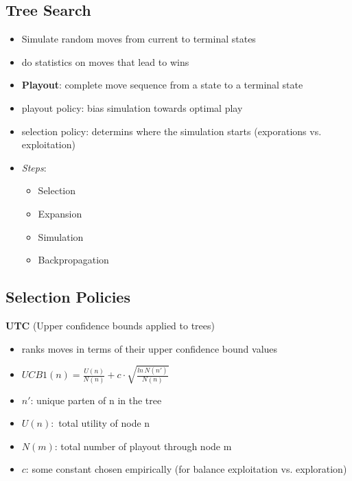 \documentclass[12pt,a4paper]{article}
\begin{document}
\subsection{Tree Search}
\begin{itemize}
\setlength\itemsep{0.05cm}
\item Simulate random moves from current to terminal states
\item do statistics on moves that lead to wins
\item \textbf{Playout}: complete move sequence from a state to a terminal state
\item playout policy: bias simulation towards optimal play
\item selection policy: determins where the simulation starts (exporations vs. exploitation)
\item \textit{Steps}:
\begin{itemize}
\setlength\itemsep{0.05cm}
\item Selection
\item Expansion
\item Simulation
\item Backpropagation
\end{itemize}
\end{itemize}

\subsection{Selection Policies}
\textbf{UTC} (Upper confidence bounds applied to trees)
\begin{itemize}
\setlength\itemsep{0.05cm}
\item ranks moves in terms of their upper confidence bound values
\item $UCB1(n)=\frac{U(n)}{N(n)} + c\cdot \sqrt{\frac{ln \, N(n')}{N(n)}}$
\item $n'$: unique parten of n in the tree
\item $U(n):$ total utility of node n
\item $N(m)$: total number of playout through node m
\item $c$: some constant chosen empirically (for balance exploitation vs. exploration)
\end{itemize}
\end{document}
